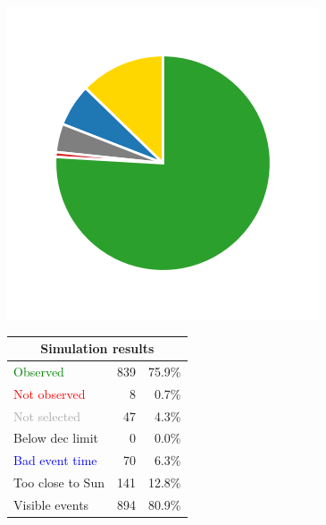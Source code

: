 \begin{colsection}
\begin{colsection}
\begin{figure}[p]
\begin{center}
    \begin{minipage}[t]{0.2\textwidth}\vspace{10pt}
    \includegraphics[width=\linewidth]{images/gw_sims/2n8+2s8_pie.png}
    \end{minipage}
    \begin{minipage}[t]{0.37\textwidth}\vspace{0pt}
    \begin{tabular}{lrr}
    \multicolumn{3}{c}{\textbf{Simulation results}} \\
    \midrule
    \textcolor{Green}{Observed} & 839 & 75.9\% \\
    \textcolor{Red}{Not observed} & 8 & 0.7\% \\
    \textcolor{darkgray}{Not selected} & 47 & 4.3\% \\
    \textcolor{NavyBlue}{Below dec limit} & 0 & 0.0\% \\
    \textcolor{Blue}{Bad event time} & 70 & 6.3\% \\
    \textcolor{BurntOrange}{Too close to Sun} & 141 & 12.8\% \\
    \midrule
    Visible events & 894 &  80.9\% \\
    \end{tabular}
    \end{minipage}

\end{center}
\end{figure}
\end{colsection}
\end{colsection}
